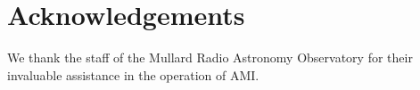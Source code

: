 \documentclass[5p,authoryear]{elsarticle}
\begin{document}
% 
% 






\section*{Acknowledgements}
We thank the staff of the Mullard Radio Astronomy Observatory for their invaluable assistance in the operation of AMI.
\end{document}

